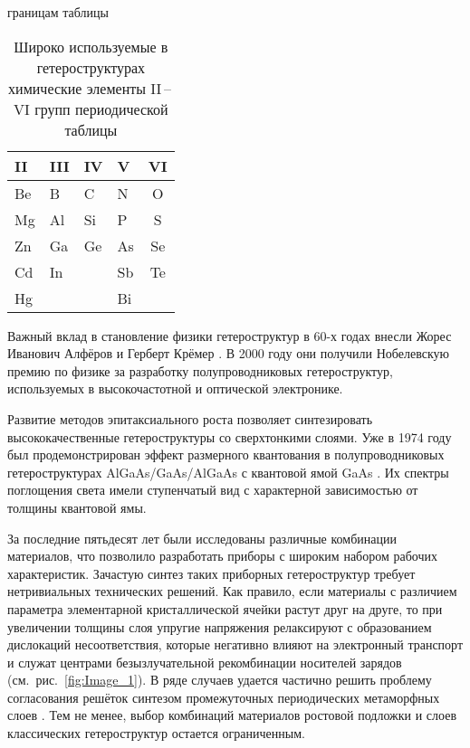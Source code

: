 \begin{table} [htbp] \centering \begin{threeparttable}%
	границам таблицы \caption{Широко используемые в гетероструктурах химические
	элементы II\,--\,VI групп периодической таблицы}\label{tab:tab1}%
	\begin{tabular}{ p{3cm}  p{3cm}  p{3cm}  p{3cm}  c } \hline \hline II & III &
		IV  & V & VI \\ \hline Be & B  & C  & N   & O   \\ Mg & Al & Si & P   & S
		\\ Zn & Ga & Ge & As  & Se  \\ Cd & In &    & Sb  & Te  \\ Hg &    &    &
	Bi  &   \\ \hline \hline \end{tabular} \end{threeparttable} \end{table}

Важный вклад в становление физики гетероструктур в 60-х годах внесли Жорес
Иванович Алфёров \cite{Alferov2001} и Герберт Крёмер \cite{Kroemer1957}. В 2000
году они получили Нобелевскую премию по физике за разработку полупроводниковых
гетероструктур, используемых в высокочастотной и оптической электронике.

Развитие методов эпитаксиального роста позволяет синтезировать
высококачественные гетероструктуры со сверхтонкими слоями. Уже в 1974 году был
продемонстрирован эффект размерного квантования в полупроводниковых
гетероструктурах AlGaAs/GaAs/AlGaAs с квантовой ямой GaAs \cite{Dingle1974}. Их
спектры поглощения света имели ступенчатый вид с характерной зависимостью от
толщины квантовой ямы.

За последние пятьдесят лет были исследованы различные комбинации материалов,
что позволило разработать приборы с широким набором рабочих характеристик.
Зачастую синтез таких приборных гетероструктур требует нетривиальных
технических решений. Как правило, если материалы с различием параметра
элементарной кристаллической ячейки растут друг на друге, то при увеличении
толщины слоя упругие напряжения релаксируют с образованием дислокаций
несоответствия, которые негативно влияют на электронный транспорт и служат
центрами безызлучательной рекомбинации носителей зарядов
(см.~рис.~\cref{fig:Image_1}). В ряде случаев удается частично решить проблему
согласования решёток синтезом промежуточных периодических метаморфных слоев
\cite{Bolshakov2019}. Тем не менее, выбор комбинаций материалов ростовой
подложки и слоев классических гетероструктур остается ограниченным.

